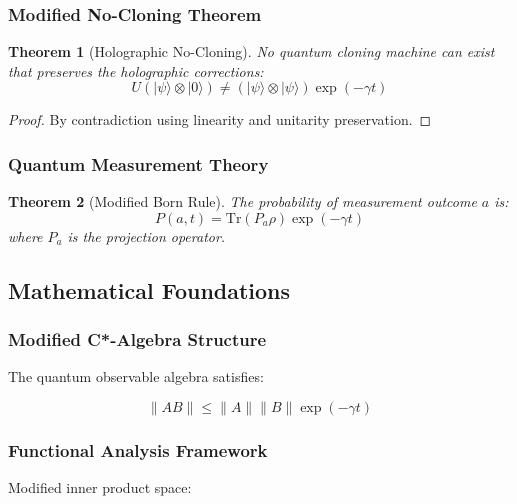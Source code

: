 \documentclass[12pt]{article}
\theoremstyle{plain}
\newtheorem{theorem}{Theorem}[section]
\theoremstyle{definition}
\theoremstyle{remark}
\begin{document}
\subsubsection{Modified No-Cloning Theorem}

\begin{theorem}[Holographic No-Cloning]
No quantum cloning machine can exist that preserves the holographic corrections:
\begin{equation}
U(|\psi\rangle\otimes|0\rangle) \neq (|\psi\rangle\otimes|\psi\rangle)\exp(-\gamma t)
\end{equation}
\end{theorem}

\begin{proof}
By contradiction using linearity and unitarity preservation.
\end{proof}

\subsubsection{Quantum Measurement Theory}

\begin{theorem}[Modified Born Rule]
The probability of measurement outcome $a$ is:
\begin{equation}
P(a,t) = \text{Tr}(P_a\rho)\exp(-\gamma t)
\end{equation}
where $P_a$ is the projection operator.
\end{theorem}

\subsection{Mathematical Foundations}

\subsubsection{Modified C*-Algebra Structure}

The quantum observable algebra satisfies:

\begin{equation}
\|AB\| \leq \|A\|\|B\|\exp(-\gamma t)
\end{equation}

\subsubsection{Functional Analysis Framework}

Modified inner product space:
\end{document}
